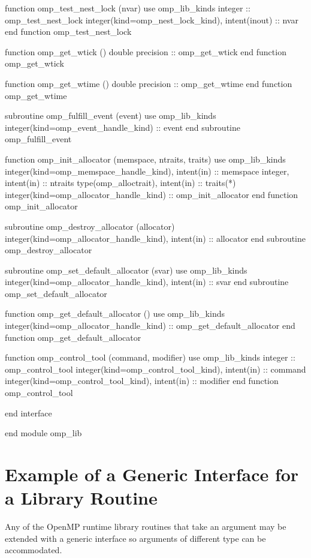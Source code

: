 {\begin{ompfFunction}
          function omp_test_nest_lock (nvar)
           use omp_lib_kinds
           integer :: omp_test_nest_lock
           integer(kind=omp_nest_lock_kind), intent(inout) :: nvar
          end function omp_test_nest_lock

          function omp_get_wtick ()
           double precision :: omp_get_wtick
          end function omp_get_wtick

          function omp_get_wtime ()
           double precision :: omp_get_wtime
          end function omp_get_wtime

          subroutine omp_fulfill_event (event)
           use omp_lib_kinds
           integer(kind=omp_event_handle_kind) :: event
          end subroutine omp_fulfill_event

          function omp_init_allocator (memspace, ntraits, traits)
           use omp_lib_kinds
           integer(kind=omp_memspace_handle_kind), intent(in) :: memspace
           integer, intent(in) :: ntraits
           type(omp_alloctrait), intent(in) :: traits(*)
           integer(kind=omp_allocator_handle_kind) :: omp_init_allocator
          end function omp_init_allocator

          subroutine omp_destroy_allocator (allocator)
           integer(kind=omp_allocator_handle_kind), intent(in) :: allocator
          end subroutine omp_destroy_allocator

          subroutine omp_set_default_allocator (svar)
           use omp_lib_kinds
           integer(kind=omp_allocator_handle_kind), intent(in) :: svar
          end subroutine omp_set_default_allocator

          function omp_get_default_allocator ()
           use omp_lib_kinds
           integer(kind=omp_allocator_handle_kind) :: omp_get_default_allocator
          end function omp_get_default_allocator

          function omp_control_tool (command, modifier)
           use omp_lib_kinds
           integer :: omp_control_tool
           integer(kind=omp_control_tool_kind), intent(in) :: command
           integer(kind=omp_control_tool_kind), intent(in) :: modifier
          end function omp_control_tool

          end interface

        end module omp_lib
\end{ompfFunction}} %






\section{Example of a Generic Interface for a Library Routine}
\label{sec:Example of a Generic Interface for a Library Routine}
Any of the OpenMP runtime library routines that take an argument may be extended
with a generic interface so arguments of different  type can be accommodated.

